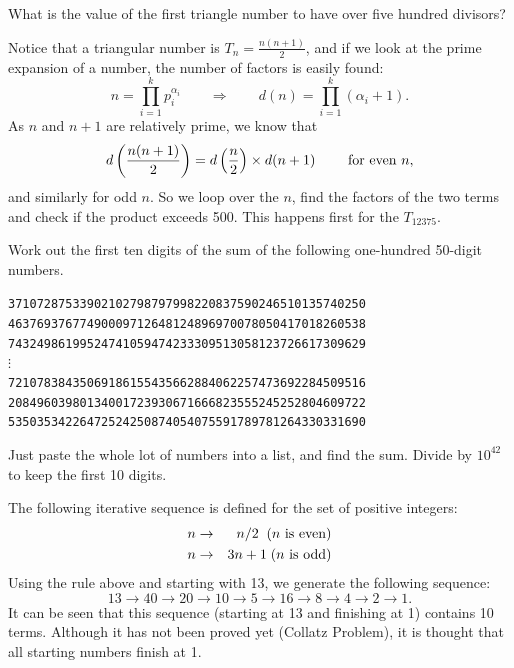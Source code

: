 What is the value of the first triangle number to have over five hundred divisors?

Notice that a triangular number is $T_n = \frac{n(n+1)}2$, and if we look at the prime expansion of a number, the number
of factors is easily found:
$$n = \prod_{i=1}^k p_i^{\alpha_i} \qquad \Rightarrow \qquad d(n) = \prod_{i=1}^k (\alpha_i+1).$$
As $n$ and $n+1$ are relatively prime, we know that
$$d\left(\frac{n(n+1)}2\right) = d\left( \frac n2 \right) \times d(n+1) \qquad \hbox{ for even }n,$$
and similarly for odd $n$.  So we loop over the $n$, find the factors of the two terms and check if the product exceeds 500.
This happens first for the $T_{12375}$.





Work out the first ten digits of the sum of the following one-hundred 50-digit numbers.
\begin{center}
\verb"37107287533902102798797998220837590246510135740250"
\verb"46376937677490009712648124896970078050417018260538"
\verb"74324986199524741059474233309513058123726617309629" \\
$\vdots$\\
\verb"72107838435069186155435662884062257473692284509516"
\verb"20849603980134001723930671666823555245252804609722"
\verb"53503534226472524250874054075591789781264330331690"
\end{center}

Just paste the whole lot of numbers into a list, and find the sum.  Divide by $10^{42}$ to keep the first 10 digits.





The following iterative sequence is defined for the set of positive integers:
\begin{eqnarray*}
n &\rightarrow &n/2 \;\;  (n \hbox{ is even)} \\
n &\rightarrow &3n + 1 \; (n \hbox{ is odd)}
\end{eqnarray*}
Using the rule above and starting with 13, we generate the following sequence:
$$13 \rightarrow 40 \rightarrow 20 \rightarrow 10 \rightarrow 5 \rightarrow 16 \rightarrow 8 \rightarrow 4 \rightarrow 2 \rightarrow 1.$$
It can be seen that this sequence (starting at 13 and finishing at 1) contains 10 terms. Although it has not been proved yet (Collatz Problem), it is thought that all starting numbers finish at 1.

